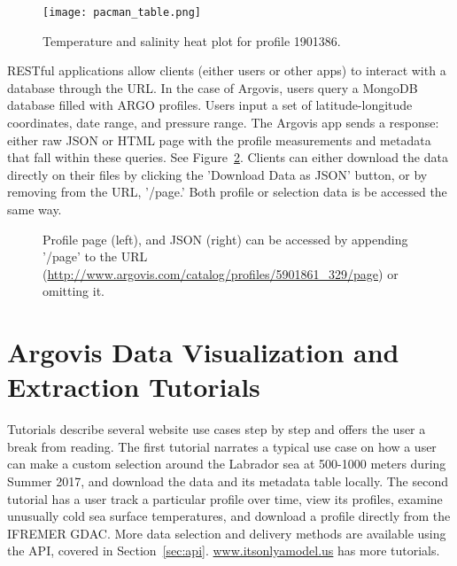 \begin{figure}[H]
\begin{minipage}{6in}
\centering
\texttt{[image: pacman\_table.png]}
\caption{\label{fig:pacman_table}Temperature and salinity heat plot for profile 1901386.}
\end{minipage}
\end{figure}

RESTful applications allow clients (either users or other apps) to interact with a database through the URL. In the case of Argovis, users query a MongoDB database filled with ARGO profiles. Users input a set of latitude-longitude coordinates, date range, and pressure range. The Argovis app sends a response: either raw JSON or HTML page with the profile measurements and metadata that fall within these queries. See Figure~\ref{fig:profile_data}. Clients can either download the data directly on their files by clicking the 'Download Data as JSON' button, or by removing from the URL, '/page.' Both profile or selection data is be accessed the same way.

\begin{figure}[H]
\begin{minipage}{6in}
\centering
{}
\caption{\label{fig:profile_data} Profile page (left), and JSON (right) can be accessed by appending '/page' to the URL (\url{http://www.argovis.com/catalog/profiles/5901861_329/page}) or omitting it.}
\end{minipage}
\end{figure}

\section{Argovis Data Visualization and Extraction Tutorials}

Tutorials describe several website use cases step by step and offers the user a break from reading. The first tutorial narrates a typical use case on how a user can make a custom selection around the Labrador sea at 500-1000 meters during Summer 2017, and download the data and its metadata table locally. The second tutorial has a user track a particular profile over time, view its profiles, examine unusually cold sea surface temperatures, and download a profile directly from the IFREMER GDAC. More data selection and delivery methods are available using the API, covered in Section~\ref{sec:api}. \url{www.itsonlyamodel.us} has more tutorials.


